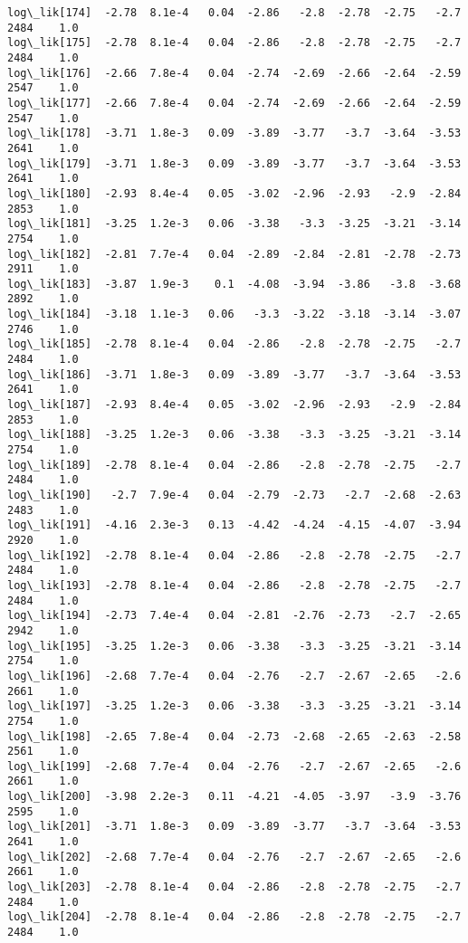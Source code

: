 \documentclass[11pt]{article}
\begin{document}
\begin{Verbatim}[commandchars=\\\{\}]
log\_lik[174]  -2.78  8.1e-4   0.04  -2.86   -2.8  -2.78  -2.75   -2.7   2484    1.0
log\_lik[175]  -2.78  8.1e-4   0.04  -2.86   -2.8  -2.78  -2.75   -2.7   2484    1.0
log\_lik[176]  -2.66  7.8e-4   0.04  -2.74  -2.69  -2.66  -2.64  -2.59   2547    1.0
log\_lik[177]  -2.66  7.8e-4   0.04  -2.74  -2.69  -2.66  -2.64  -2.59   2547    1.0
log\_lik[178]  -3.71  1.8e-3   0.09  -3.89  -3.77   -3.7  -3.64  -3.53   2641    1.0
log\_lik[179]  -3.71  1.8e-3   0.09  -3.89  -3.77   -3.7  -3.64  -3.53   2641    1.0
log\_lik[180]  -2.93  8.4e-4   0.05  -3.02  -2.96  -2.93   -2.9  -2.84   2853    1.0
log\_lik[181]  -3.25  1.2e-3   0.06  -3.38   -3.3  -3.25  -3.21  -3.14   2754    1.0
log\_lik[182]  -2.81  7.7e-4   0.04  -2.89  -2.84  -2.81  -2.78  -2.73   2911    1.0
log\_lik[183]  -3.87  1.9e-3    0.1  -4.08  -3.94  -3.86   -3.8  -3.68   2892    1.0
log\_lik[184]  -3.18  1.1e-3   0.06   -3.3  -3.22  -3.18  -3.14  -3.07   2746    1.0
log\_lik[185]  -2.78  8.1e-4   0.04  -2.86   -2.8  -2.78  -2.75   -2.7   2484    1.0
log\_lik[186]  -3.71  1.8e-3   0.09  -3.89  -3.77   -3.7  -3.64  -3.53   2641    1.0
log\_lik[187]  -2.93  8.4e-4   0.05  -3.02  -2.96  -2.93   -2.9  -2.84   2853    1.0
log\_lik[188]  -3.25  1.2e-3   0.06  -3.38   -3.3  -3.25  -3.21  -3.14   2754    1.0
log\_lik[189]  -2.78  8.1e-4   0.04  -2.86   -2.8  -2.78  -2.75   -2.7   2484    1.0
log\_lik[190]   -2.7  7.9e-4   0.04  -2.79  -2.73   -2.7  -2.68  -2.63   2483    1.0
log\_lik[191]  -4.16  2.3e-3   0.13  -4.42  -4.24  -4.15  -4.07  -3.94   2920    1.0
log\_lik[192]  -2.78  8.1e-4   0.04  -2.86   -2.8  -2.78  -2.75   -2.7   2484    1.0
log\_lik[193]  -2.78  8.1e-4   0.04  -2.86   -2.8  -2.78  -2.75   -2.7   2484    1.0
log\_lik[194]  -2.73  7.4e-4   0.04  -2.81  -2.76  -2.73   -2.7  -2.65   2942    1.0
log\_lik[195]  -3.25  1.2e-3   0.06  -3.38   -3.3  -3.25  -3.21  -3.14   2754    1.0
log\_lik[196]  -2.68  7.7e-4   0.04  -2.76   -2.7  -2.67  -2.65   -2.6   2661    1.0
log\_lik[197]  -3.25  1.2e-3   0.06  -3.38   -3.3  -3.25  -3.21  -3.14   2754    1.0
log\_lik[198]  -2.65  7.8e-4   0.04  -2.73  -2.68  -2.65  -2.63  -2.58   2561    1.0
log\_lik[199]  -2.68  7.7e-4   0.04  -2.76   -2.7  -2.67  -2.65   -2.6   2661    1.0
log\_lik[200]  -3.98  2.2e-3   0.11  -4.21  -4.05  -3.97   -3.9  -3.76   2595    1.0
log\_lik[201]  -3.71  1.8e-3   0.09  -3.89  -3.77   -3.7  -3.64  -3.53   2641    1.0
log\_lik[202]  -2.68  7.7e-4   0.04  -2.76   -2.7  -2.67  -2.65   -2.6   2661    1.0
log\_lik[203]  -2.78  8.1e-4   0.04  -2.86   -2.8  -2.78  -2.75   -2.7   2484    1.0
log\_lik[204]  -2.78  8.1e-4   0.04  -2.86   -2.8  -2.78  -2.75   -2.7   2484    1.0

\end{Verbatim}
\end{document}

